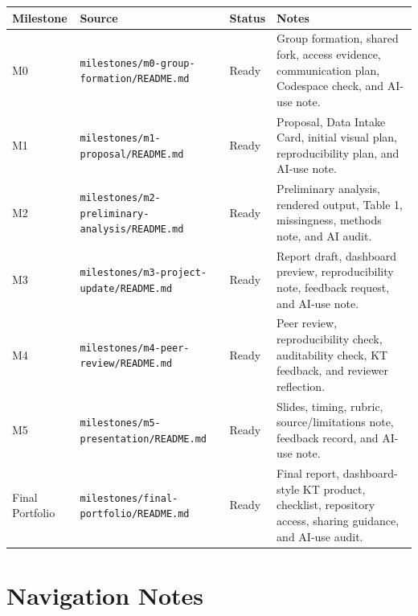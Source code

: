 \documentclass[
  letterpaper,
  DIV=11,
  numbers=noendperiod,
  oneside]{scrreprt}
\begin{document}
\begin{longtable}[]{@{}
  >{\raggedright\arraybackslash}p{}
  >{\raggedright\arraybackslash}p{}
  >{\raggedright\arraybackslash}p{}
  >{\raggedright\arraybackslash}p{}@{}}
\toprule\noalign{}
\begin{minipage}[b]{\linewidth}\raggedright
Milestone
\end{minipage} & \begin{minipage}[b]{\linewidth}\raggedright
Source
\end{minipage} & \begin{minipage}[b]{\linewidth}\raggedright
Status
\end{minipage} & \begin{minipage}[b]{\linewidth}\raggedright
Notes
\end{minipage} \\
\midrule\noalign{}
\endhead
\bottomrule\noalign{}
\endlastfoot
M0 & \texttt{milestones/m0-group-formation/README.md} & Ready & Group
formation, shared fork, access evidence, communication plan, Codespace
check, and AI-use note. \\
M1 & \texttt{milestones/m1-proposal/README.md} & Ready & Proposal, Data
Intake Card, initial visual plan, reproducibility plan, and AI-use
note. \\
M2 & \texttt{milestones/m2-preliminary-analysis/README.md} & Ready &
Preliminary analysis, rendered output, Table 1, missingness, methods
note, and AI audit. \\
M3 & \texttt{milestones/m3-project-update/README.md} & Ready & Report
draft, dashboard preview, reproducibility note, feedback request, and
AI-use note. \\
M4 & \texttt{milestones/m4-peer-review/README.md} & Ready & Peer review,
reproducibility check, auditability check, KT feedback, and reviewer
reflection. \\
M5 & \texttt{milestones/m5-presentation/README.md} & Ready & Slides,
timing, rubric, source/limitations note, feedback record, and AI-use
note. \\
Final Portfolio & \texttt{milestones/final-portfolio/README.md} & Ready
& Final report, dashboard-style KT product, checklist, repository
access, sharing guidance, and AI-use audit. \\
\end{longtable}

\section{Navigation Notes}\label{navigation-notes}
\end{document}
